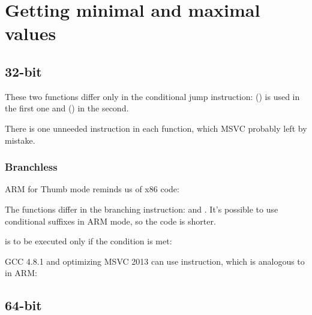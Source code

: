 ﻿\section{Getting minimal and maximal values}

\subsection{32-bit}






These two functions differ only in the conditional jump instruction: 
 () is used in the first one
and  () in the second.

\myindex{\CompilerAnomaly}
\label{MSVC_double_JMP_anomaly}

There is one unneeded \JMP instruction in each function, which MSVC probably left by mistake.

\subsubsection{Branchless}

ARM for Thumb mode reminds us of x86 code:




The functions differ in the branching instruction:  and .
It's possible to use conditional suffixes in ARM mode, so the code is shorter.

 is to be executed only if the condition is met:



\Optimizing GCC 4.8.1 and optimizing MSVC 2013 can use  instruction, which is analogous to  in ARM:



\subsection{64-bit}

